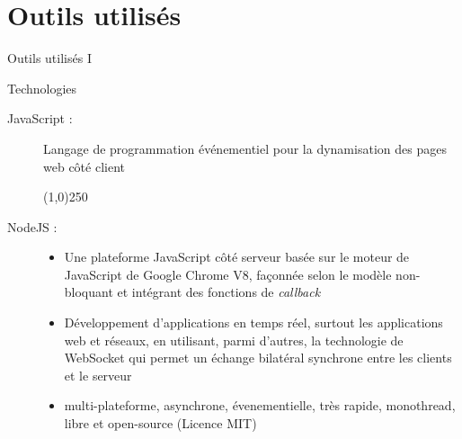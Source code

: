 \documentclass{bredelebeamer}
\begin{document}
  \section{Outils utilisés}
  \begin{frame}{Outils utilisés I}
    \begin{block}{Technologies}
      \begin{description}
        \item [JavaScript :]{
        Langage de programmation événementiel pour la dynamisation des pages web côté client
        }
        \pause
        \begin{center}
          \line(1,0){250}
        \end{center}
        \item [NodeJS :]{
          \begin{itemize}
            \item {Une plateforme JavaScript côté serveur basée sur le moteur de JavaScript de Google Chrome V8, façonnée selon le modèle non-bloquant et intégrant des fonctions de \textit{callback}}
            \pause
            \item {Développement d'applications en temps réel, surtout les applications web et réseaux, en utilisant, parmi d'autres, la technologie de WebSocket qui permet un échange bilatéral synchrone entre les clients et le serveur}
            \pause
            \item {multi-plateforme, asynchrone, évenementielle, très rapide, monothread, libre et open-source (Licence MIT)}
          \end{itemize}
        }
      \end{description}
    \end{block}
  \end{frame}
\end{document}
